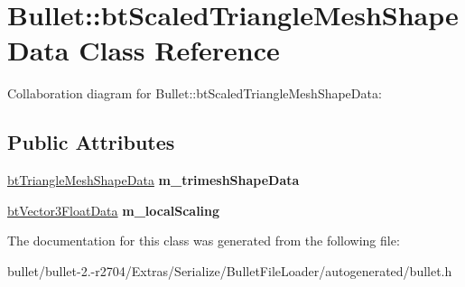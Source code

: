 \hypertarget{class_bullet_1_1bt_scaled_triangle_mesh_shape_data}{\section{Bullet\+:\+:bt\+Scaled\+Triangle\+Mesh\+Shape\+Data Class Reference}
\label{class_bullet_1_1bt_scaled_triangle_mesh_shape_data}
}


Collaboration diagram for Bullet\+:\+:bt\+Scaled\+Triangle\+Mesh\+Shape\+Data\+:
\subsection*{Public Attributes}
\begin{DoxyCompactItemize}
\item 
\hypertarget{class_bullet_1_1bt_scaled_triangle_mesh_shape_data_aeed047e3692d84ace846e58aa08c350b}{\hyperlink{class_bullet_1_1bt_triangle_mesh_shape_data}{bt\+Triangle\+Mesh\+Shape\+Data} {\bfseries m\+\_\+trimesh\+Shape\+Data}}\label{class_bullet_1_1bt_scaled_triangle_mesh_shape_data_aeed047e3692d84ace846e58aa08c350b}

\item 
\hypertarget{class_bullet_1_1bt_scaled_triangle_mesh_shape_data_ad9d0ebeffc21c1c8a09f71491890eb51}{\hyperlink{class_bullet_1_1bt_vector3_float_data}{bt\+Vector3\+Float\+Data} {\bfseries m\+\_\+local\+Scaling}}\label{class_bullet_1_1bt_scaled_triangle_mesh_shape_data_ad9d0ebeffc21c1c8a09f71491890eb51}

\end{DoxyCompactItemize}


The documentation for this class was generated from the following file\+:\begin{DoxyCompactItemize}
\item 
bullet/bullet-\/2.-\/r2704/\+Extras/\+Serialize/\+Bullet\+File\+Loader/autogenerated/bullet.\+h\end{DoxyCompactItemize}
